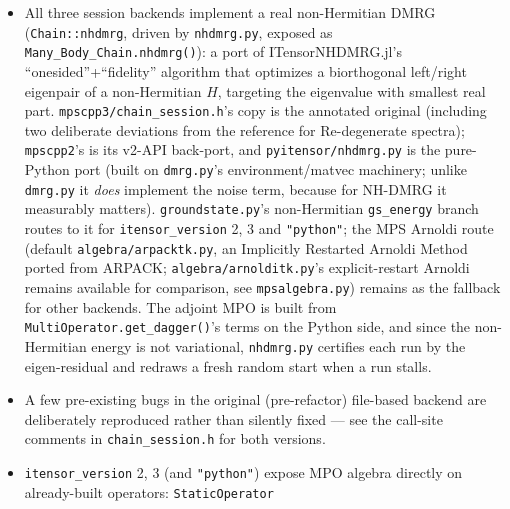 \documentclass[11pt]{article}
\begin{document}
\begin{itemize}
    that example's module docstring for the full diagnosis.
    \texttt{evolve\_and\_measure\_tdvp[\_gse]}/
    \texttt{evolve\_and\_measure\_tebd} all copy their input \texttt{wf}
    before evolving (\texttt{wf.copy()}) rather than evolving it in
    place --- both TDVP's \texttt{\_tdvp\_step\_fn} and
    \texttt{TEBDEvolver.step()} mutate their input MPS's tensor list via
    \texttt{set\_A()}, so without the copy, evolving the default
    \texttt{wf=self.wf0} (the common case, see \texttt{timedependent.py}'s
    \texttt{evolve\_and\_measure\_dmrg()}) would silently corrupt the
    cached ground state itself.
  \item All three session backends implement a real non-Hermitian DMRG
    (\texttt{Chain::nhdmrg}, driven by \texttt{nhdmrg.py}, exposed as
    \texttt{Many\_Body\_Chain.nhdmrg()}): a port of ITensorNHDMRG.jl's
    ``onesided''+``fidelity'' algorithm that optimizes a biorthogonal
    left/right eigenpair of a non-Hermitian $H$, targeting the eigenvalue
    with smallest real part. \texttt{mpscpp3/chain\_session.h}'s copy is
    the annotated original (including two deliberate deviations from the
    reference for Re-degenerate spectra); \texttt{mpscpp2}'s is its
    v2-API back-port, and \texttt{pyitensor/nhdmrg.py} is the pure-Python
    port (built on \texttt{dmrg.py}'s environment/matvec machinery;
    unlike \texttt{dmrg.py} it \emph{does} implement the noise term,
    because for NH-DMRG it measurably matters). \texttt{groundstate.py}'s
    non-Hermitian \texttt{gs\_energy} branch routes to it for
    \texttt{itensor\_version} 2, 3 and \texttt{"python"}; the MPS Arnoldi
    route (default \texttt{algebra/arpacktk.py}, an Implicitly Restarted
    Arnoldi Method ported from ARPACK; \texttt{algebra/arnolditk.py}'s
    explicit-restart Arnoldi remains available for comparison, see
    \texttt{mpsalgebra.py}) remains as the fallback for other backends.
    The adjoint MPO is built from
    \texttt{MultiOperator.get\_dagger()}'s terms on the Python side, and
    since the non-Hermitian energy is not variational, \texttt{nhdmrg.py}
    certifies each run by the eigen-residual and redraws a fresh random
    start when a run stalls.
  \item A few pre-existing bugs in the original (pre-refactor) file-based
    backend are deliberately reproduced rather than silently fixed --- see
    the call-site comments in \texttt{chain\_session.h} for both
    versions.
  \item \texttt{itensor\_version} 2, 3 (and \texttt{"python"}) expose MPO
    algebra directly on already-built operators: \texttt{StaticOperator}

\end{itemize}
\end{document}

